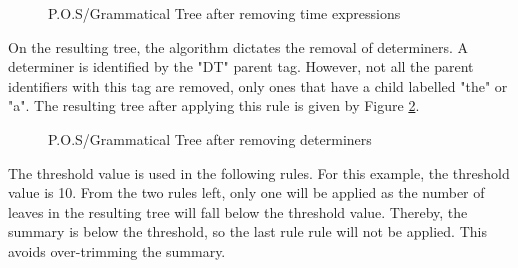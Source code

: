 \begin{figure}[h]
\caption{P.O.S/Grammatical Tree after removing time expressions}
\label{tree:removeTime}
\end{figure}
\par On the resulting tree, the algorithm dictates the removal of determiners. A determiner is identified by the "DT" parent tag. However, not all the parent identifiers with this tag are removed, only ones that have a child labelled "the" or "a". The resulting tree after applying this rule is given by Figure \ref{tree:removeDeterminers}.
\begin{figure}[h]
\caption{P.O.S/Grammatical Tree after removing determiners}
\label{tree:removeDeterminers}
\end{figure}
\par The threshold value is used in the following rules. For this example, the threshold value is 10. From the two rules left, only one will be applied as the number of leaves in the resulting tree will fall below the threshold value. Thereby, the summary is below the threshold, so the last rule rule will not be applied. This avoids over-trimming the summary.
